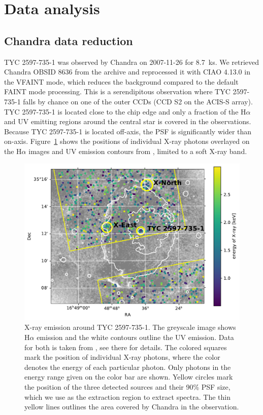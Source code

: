 \documentclass[]{aastex631}
\begin{document}
\section{Data analysis} \label{sec:data}
\subsection{Chandra data reduction}
TYC 2597-735-1 was observed by Chandra on 2007-11-26 for 8.7~ks.
We retrieved Chandra OBSID 8636 from  the archive and reprocessed it with CIAO 4.13.0 \citep{2006SPIE.6270E..1VF} in the VFAINT mode, which reduces the background compared to the default FAINT mode processing. This is a serendipitous observation where TYC 2597-735-1 falls by chance on one of the outer CCDs (CCD S2 on the ACIS-S array). TYC 2597-735-1 is located close to the chip edge and only a fraction of the H$\alpha$ and UV emitting regions around the central star is covered in the observations. Because TYC 2597-735-1 is located off-axis, the PSF is significantly wider than on-axis. Figure~\ref{fig:chandraimage} shows the positions of individual X-ray photons overlayed on the H$\alpha$ images and UV emission contours from \citet{2020Natur.587..387H}, limited to a soft X-ray band.
\begin{figure}
    \centering
    \includegraphics[width=\textwidth]{figures/chandraimage.pdf}
    \caption{X-ray emission around TYC 2597-735-1. The greyscale image shows H$\alpha$ emission and the white contours outline the UV emission. Data for both is taken from \citet{2020Natur.587..387H}, see there for details. The colored squares mark the position of individual X-ray photons, where the color denotes the energy of each particular photon. Only photons in the energy range given on the color bar are shown. Yellow circles mark the position of the three detected sources and their 90\% PSF size, which we use as the extraction region to extract spectra. The thin yellow lines outlines the area covered by Chandra in the observation.}
    \label{fig:chandraimage}
\end{figure}
\end{document}
